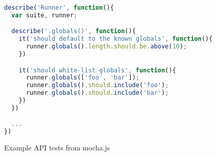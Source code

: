 \begin{figure*}
\begin{lstlisting}[language=javascript]
describe('Runner', function(){
  var suite, runner;

  describe('.globals()', function(){
    it('should default to the known globals', function(){
      runner.globals().length.should.be.above(10);
    })

    it('should white-list globals', function(){
      runner.globals(['foo', 'bar']);
      runner.globals().should.include('foo');
      runner.globals().should.include('bar');
    })
  })

  ...
})
\end{lstlisting}

\caption{Example API tests from mocha.js}
\end{figure*}